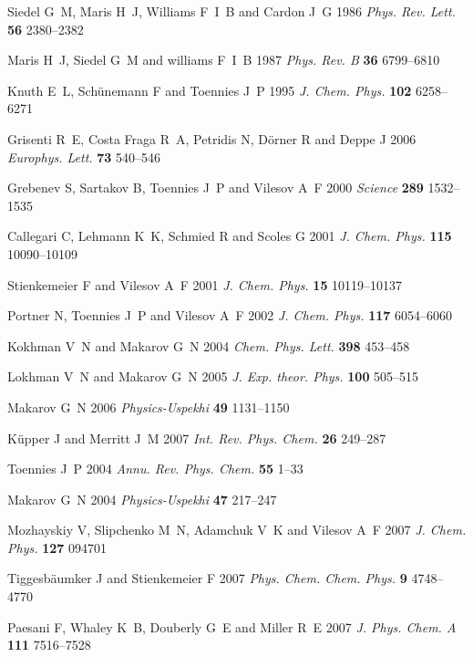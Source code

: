 \documentclass[12pt]{iopart}
\begin{document}
\begin{thebibliography}{100}
Siedel G~M, Maris H~J, Williams F~I~B and Cardon J~G 1986 {\em Phys. Rev.
  Lett.\/} {\bf 56} 2380--2382

Maris H~J, Siedel G~M and williams F~I~B 1987 {\em Phys. Rev. B\/} {\bf 36}
  6799--6810

Knuth E~L, Sch{\"u}nemann F and Toennies J~P 1995 {\em J. Chem. Phys.\/} {\bf
  102} 6258--6271

Grisenti R~E, {Costa Fraga} R~A, Petridis N, D{\"o}rner R and Deppe J 2006 {\em
  Europhys. Lett.\/} {\bf 73} 540--546

Grebenev S, Sartakov B, Toennies J~P and Vilesov A~F 2000 {\em Science\/} {\bf
  289} 1532--1535

Callegari C, Lehmann K~K, Schmied R and Scoles G 2001 {\em J. Chem. Phys.\/}
  {\bf 115} 10090--10109

Stienkemeier F and Vilesov A~F 2001 {\em J. Chem. Phys.\/} {\bf 15}
  10119--10137

Portner N, Toennies J~P and Vilesov A~F 2002 {\em J. Chem. Phys.\/} {\bf 117}
  6054--6060

Kokhman V~N and Makarov G~N 2004 {\em Chem. Phys. Lett.\/} {\bf 398} 453--458

Lokhman V~N and Makarov G~N 2005 {\em J. Exp. theor. Phys.\/} {\bf 100}
  505--515

Makarov G~N 2006 {\em Physics-Uspekhi\/} {\bf 49} 1131--1150

K{\"u}pper J and Merritt J~M 2007 {\em Int. Rev. Phys. Chem.\/} {\bf 26}
  249--287

Toennies J~P 2004 {\em Annu. Rev. Phys. Chem.\/} {\bf 55} 1--33

Makarov G~N 2004 {\em Physics-Uspekhi\/} {\bf 47} 217--247

Mozhayskiy V, Slipchenko M~N, Adamchuk V~K and Vilesov A~F 2007 {\em J. Chem.
  Phys.\/} {\bf 127} 094701

Tiggesb{\"a}umker J and Stienkemeier F 2007 {\em Phys. Chem. Chem. Phys.\/}
  {\bf 9} 4748--4770

Paesani F, Whaley K~B, Douberly G~E and Miller R~E 2007 {\em J. Phys. Chem.
  A\/} {\bf 111} 7516--7528


\end{thebibliography}
\end{document}
